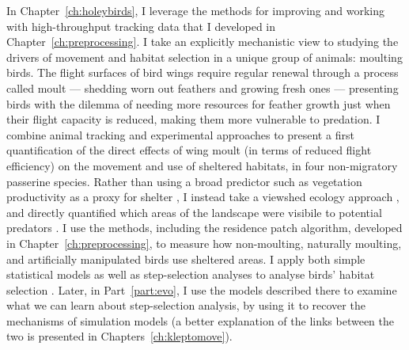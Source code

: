 In Chapter~\ref{ch:holeybirds}, I leverage the methods for improving and working with high-throughput tracking data that I developed in Chapter~\ref{ch:preprocessing}.
I take an explicitly mechanistic view to studying the drivers of movement and habitat selection in a unique group of animals: moulting birds.
The flight surfaces of bird wings require regular renewal through a process called moult --- shedding worn out feathers and growing fresh ones --- presenting birds with the dilemma of needing more resources for feather growth just when their flight capacity is reduced, making them more vulnerable to predation.
I combine animal tracking and experimental approaches to present a first quantification of the direct effects of wing moult (in terms of reduced flight efficiency) on the movement and use of sheltered habitats, in four non-migratory passerine species.
Rather than using a broad predictor such as vegetation productivity as a proxy for shelter \parencite{pettorelli2011}, I instead take a viewshed ecology approach \parencite{aben2018}, and directly quantified which areas of the landscape were visibile to potential predators \parencite[the `fearscape':][]{olsoy2015}.
I use the methods, including the residence patch algorithm, developed in Chapter~\ref{ch:preprocessing}, to measure how non-moulting, naturally moulting, and artificially manipulated birds use sheltered areas.
I apply both simple statistical models as well as step-selection analyses to analyse birds' habitat selection \parencite{fortin2005,avgar2016}.
Later, in Part~\ref{part:evo}, I use the models described there to examine what we can learn about step-selection analysis, by using it to recover the mechanisms of simulation models (a better explanation of the links between the two is presented in Chapters~\ref{ch:kleptomove}).

\medskip

